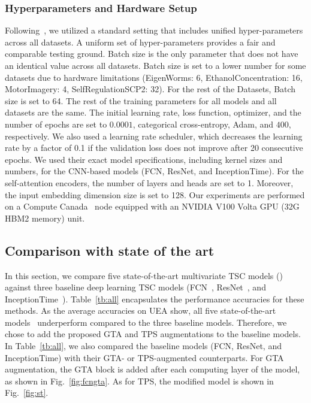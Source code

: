 \documentclass[journal]{IEEEtran}
\begin{document}
\subsubsection{Hyperparameters and Hardware Setup}
Following~\cite{fawaz2020inceptiontime,rank1}, we utilized a standard setting that includes unified hyper-parameters across all datasets. A uniform set of hyper-parameters provides a fair and comparable testing ground. Batch size is the only parameter that does not have an identical value across all datasets. Batch size is set to a lower number for some datasets due to hardware limitations (EigenWorms: 6, EthanolConcentration: 16, MotorImagery: 4, SelfRegulationSCP2: 32). For the rest of the Datasets, Batch size is set to 64. The rest of the training parameters for all models and all datasets are the same. The initial learning rate, loss function, optimizer, and the number of epochs are set to $0.0001$, categorical cross-entropy, Adam, and $400$, respectively. We also used a learning rate scheduler, which decreases the learning rate by a factor of 0.1 if the validation loss does not improve after 20 consecutive epochs. We used their exact model specifications, including kernel sizes and numbers, for the CNN-based models (FCN, ResNet, and InceptionTime). For the self-attention encoders, the number of layers and heads are set to 1. Moreover, the input embedding dimension size is set to 128. Our experiments are performed on a Compute Canada~\cite{compute-canada} node equipped with an NVIDIA V100 Volta GPU (32G HBM2 memory) unit.

\subsection{Comparison with state of the art}
In this section, we compare five state-of-the-art multivariate TSC models (\cite{chen_da-net_2022,tapnet,tang_omni-scale_2022,xcm,shapenet}) against three baseline deep learning TSC models (FCN~\cite{wang2017time}, ResNet~\cite{wang2017time}, and InceptionTime~\cite{fawaz2020inceptiontime}). Table~\ref{tb:all} encapsulates the performance accuracies for these methods. As the average accuracies on UEA show, all five state-of-the-art models~\cite{chen_da-net_2022,tapnet,tang_omni-scale_2022,xcm,shapenet} underperform compared to the three baseline models. Therefore, we chose to add the proposed GTA and TPS augmentations to the baseline models. In Table~\ref{tb:all}, we also compared the baseline models (FCN, ResNet, and InceptionTime) with their GTA- or TPS-augmented counterparts. For GTA augmentation, the GTA block is added after each computing layer of the model, as shown in Fig.~\ref{fig:fcngta}. As for TPS, the modified model is shown in Fig.~\ref{fig:st}. 
\end{document}
